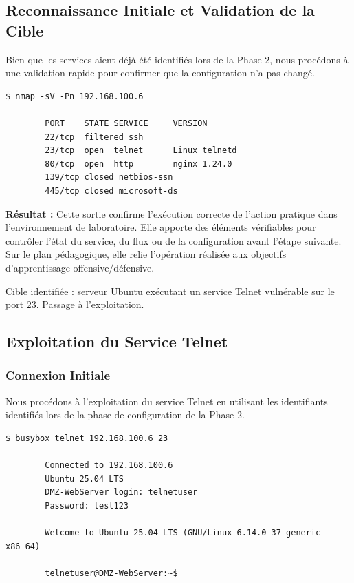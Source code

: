 \documentclass[12pt,a4paper,openany]{report}
\begin{document}
	\subsection{Reconnaissance Initiale et Validation de la Cible}
	
	Bien que les services aient déjà été identifiés lors de la Phase 2, nous procédons à une validation rapide pour confirmer que la configuration n'a pas changé.
	
	\begin{lstlisting}[caption=Scan Nmap de Validation]
		$ nmap -sV -Pn 192.168.100.6
		
		PORT    STATE SERVICE     VERSION
		22/tcp  filtered ssh
		23/tcp  open  telnet      Linux telnetd
		80/tcp  open  http        nginx 1.24.0
		139/tcp closed netbios-ssn
		445/tcp closed microsoft-ds
	\end{lstlisting}
	
	\textbf{Résultat :} Cette sortie confirme l'exécution correcte de l'action pratique dans l'environnement de laboratoire. Elle apporte des éléments vérifiables pour contrôler l'état du service, du flux ou de la configuration avant l'étape suivante. Sur le plan pédagogique, elle relie l'opération réalisée aux objectifs d'apprentissage offensive/défensive.
	
	
	Cible identifiée : serveur Ubuntu exécutant un service Telnet vulnérable sur le port 23. Passage à l'exploitation.
	
	\subsection{Exploitation du Service Telnet}
	
	\subsubsection{Connexion Initiale}
	
	Nous procédons à l'exploitation du service Telnet en utilisant les identifiants identifiés lors de la phase de configuration de la Phase 2.
	
	\begin{lstlisting}[caption=Accès Telnet Initial]
		$ busybox telnet 192.168.100.6 23
		
		Connected to 192.168.100.6
		Ubuntu 25.04 LTS
		DMZ-WebServer login: telnetuser
		Password: test123
		
		Welcome to Ubuntu 25.04 LTS (GNU/Linux 6.14.0-37-generic x86_64)
		
		telnetuser@DMZ-WebServer:~$
	\end{lstlisting}
	
\end{document}
